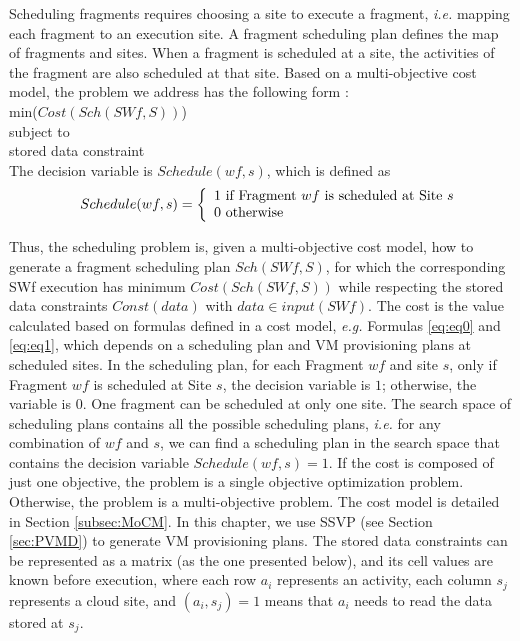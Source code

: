 Scheduling fragments requires choosing a site to execute a fragment, \textit{i.e.} mapping each fragment to an execution site. A fragment scheduling plan defines the map of fragments and sites. When a fragment is scheduled at a site, the activities of the fragment are also scheduled at that site. 
Based on a multi-objective cost model, the problem we address has the following form \cite{Ozsu2011}: \\
\indent min($Cost(Sch(SWf, S))$)\\
subject to\\
\indent stored data constraint\\
The decision variable is $Schedule(wf, s)$, which is defined as\\
\begin{equation*}
\indent Schedule(wf, s) = \left\{
\begin{array}{ll}
{1} ~\text{if Fragment $wf$ is scheduled at Site $s$} \\
{0} ~\text{otherwise} 
\end{array}
\right.
\end{equation*}

Thus, the scheduling problem is, given a multi-objective cost model, how to generate a fragment scheduling plan $Sch( SWf, S)$, for which the corresponding SWf execution has minimum $Cost(Sch(SWf, S))$ while respecting the stored data constraints $Const(data)$ with $data \in input (SWf)$. The cost is the value calculated based on formulas defined in a cost model, \textit{e.g.} Formulas \ref{eq:eq0} and \ref{eq:eq1}, which depends on a scheduling plan and VM provisioning plans at scheduled sites. In the scheduling plan, for each Fragment $wf$ and site $s$, only if Fragment $wf$ is scheduled at Site $s$, the decision variable is $1$; otherwise, the variable is $0$. One fragment can be scheduled at only one site. The search space of scheduling plans contains all the possible scheduling plans, \textit{i.e.} for any combination of $wf$ and $s$, we can find a scheduling plan in the search space that contains the decision variable $Schedule(wf, s) = 1$. If the cost is composed of just one objective, the problem is a single objective optimization problem. Otherwise, the problem is a multi-objective problem. 
The cost model is detailed in Section \ref{subsec:MoCM}. 
In this chapter, we use SSVP (see Section \ref{sec:PVMD}) to generate VM provisioning plans. The stored data constraints can be represented as a matrix (as the one presented below), and its cell values are known before execution, where each row $a_i$ represents an activity, each column $s_j$ represents a cloud site, and $(a_i, s_j) = 1$ means that $a_i$ needs to read the data stored at $s_j$.


